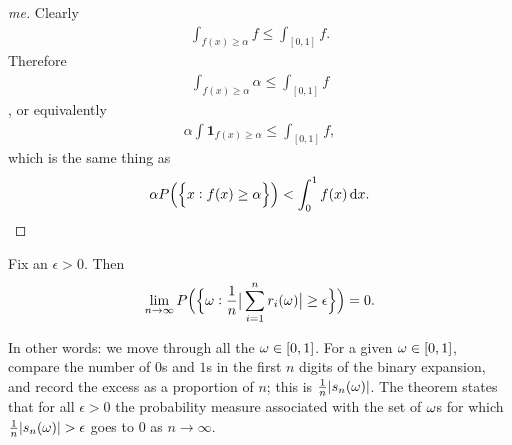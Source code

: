 \begin{proof}
  [me]

  Clearly
  \begin{align*}
    \int_{f(x) \geq \alpha} f \leq \int_{[0, 1]} f.
  \end{align*}
  Therefore
  \begin{align*}
    \int_{f(x) \geq \alpha} \alpha \leq \int_{[0, 1]} f
  \end{align*},
  or equivalently
\begin{align*}
  \alpha \int \textbf{1}_{f(x) \geq \alpha} \leq \int_{[0, 1]} f,
\end{align*}
which is the same thing as
  \begin{align*}
    \alpha P\Big(\Big\{x: f(x) \geq \alpha\Big\}\Big) < \int_0^1 f(x) \dx.
  \end{align*}
\end{proof}

\begin{theorem}
  Fix an $\epsilon > 0$. Then
  \begin{align*}
    \lim_{n \to \infty}P\Big(\Big\{\om: \frac{1}{n}\big|\sum_{i=1}^n r_i(\om)\big| \geq \epsilon\Big\}\Big) = 0.
  \end{align*}
\end{theorem}

In other words: we move through all the $\omega \in [0, 1]$. For a given $\omega \in [0, 1]$, compare the number
of $0$s and $1$s in the first $n$ digits of the binary expansion, and record the excess as a proportion of $n$;
this is $\frac{1}{n}|s_n(\omega)|$. The theorem states that for all $\epsilon > 0$ the probability measure
associated with the set of $\omega$s for which $\frac{1}{n}|s_n(\omega)| > \epsilon$ goes to $0$ as $n \to \infty$.

